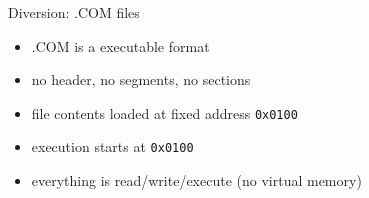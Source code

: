 
\begin{frame}{Diversion: .COM files}
    \begin{itemize}
    \item .COM is a  executable format
    \item no header, no segments, no sections
    \item file contents loaded at fixed address {\tt 0x0100}
    \item execution starts at {\tt 0x0100}
    \item everything is read/write/execute (no virtual memory)
    \end{itemize}
\end{frame}


